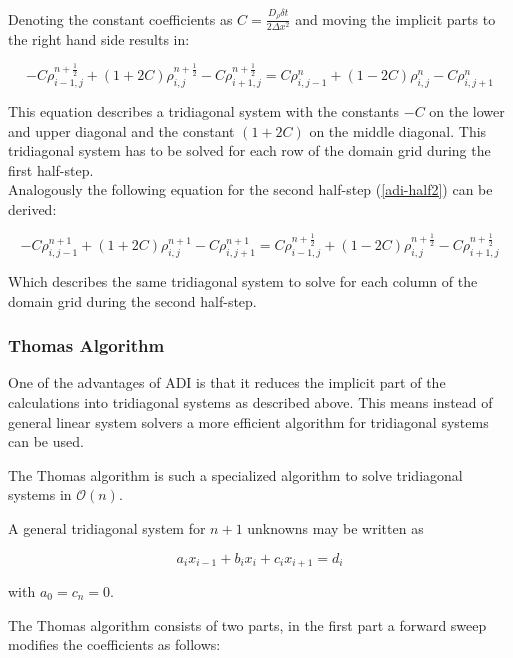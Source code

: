 \documentclass[11pt,a4paper]{article} %
\begin{document}
Denoting the constant coefficients as $ C = \frac{D_\rho \delta t}{2 \Delta x^2} $ and moving the implicit parts to the right hand side results in:

\begin{equation} \label{adi_half1_separated}
-C \rho_{i-1,j}^{n+\frac{1}{2}} + (1 + 2C) \rho_{i,j}^{n+\frac{1}{2}} - C \rho_{i+1,j}^{n+\frac{1}{2}} = C \rho_{i,j-1}^{n} + (1 - 2C) \rho_{i,j}^{n} - C \rho_{i,j+1}^{n} 
\end{equation}

This equation describes a tridiagonal system with the constants $-C$ on the lower and upper diagonal and the constant $ (1 + 2C) $ on the middle diagonal.
This tridiagonal system has to be solved for each row of the domain grid during the first half-step. \\

Analogously the following equation for the second half-step (\ref{adi-half2}) can be derived:

\begin{equation} \label{adi_half2_separated}
-C \rho_{i,j-1}^{n+1} + (1 + 2C) \rho_{i,j}^{n+1} - C \rho_{i,j+1}^{n+1} = C \rho_{i-1,j}^{n+\frac{1}{2}} + (1 - 2C) \rho_{i,j}^{n+\frac{1}{2}} - C \rho_{i+1,j}^{n+\frac{1}{2}}
\end{equation}

Which describes the same tridiagonal system to solve for each column of the domain grid during the second half-step.

\subsubsection{Thomas Algorithm}

One of the advantages of ADI is that it reduces the implicit part of the calculations into tridiagonal systems as described above.
This means instead of general linear system solvers a more efficient algorithm for tridiagonal systems can be used.

The Thomas algorithm is such a specialized algorithm to solve tridiagonal systems in $\mathcal O(n)$.

A general tridiagonal system for $n+1$ unknowns may be written as 

\begin{equation} \label{gen_tridiag}
a_{i} x_{i-1} + b_{i} x_{i} + c_{i} x_{i+1} = d_{i}
\end{equation}

with $a_{0} = c_{n} = 0$.

The Thomas algorithm consists of two parts, in the first part a forward sweep modifies the coefficients as follows:
\end{document}
